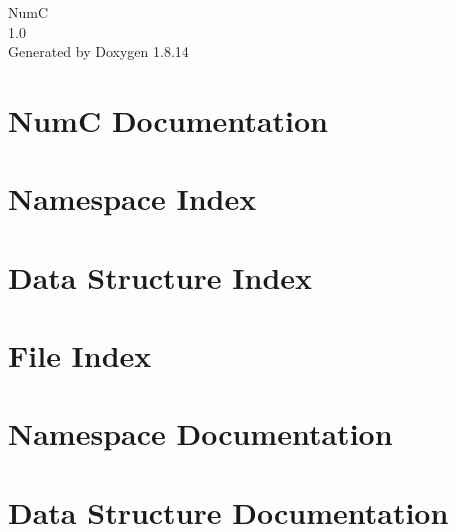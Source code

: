 \documentclass[twoside]{book}
\newcommand{\+}{\discretionary{\mbox{\scriptsize$\hookleftarrow$}}{}{}}
\newcommand{\clearemptydoublepage}{%
  \newpage{\pagestyle{empty}\cleardoublepage}%
}
\begin{document}
\hypersetup{pageanchor=false,
             bookmarksnumbered=true,
             pdfencoding=unicode
            }
\begin{titlepage}
\vspace*{7cm}
\begin{center}%
{\Large NumC \\[1ex]\large 1.\+0 }\\
\vspace*{1cm}
{\large Generated by Doxygen 1.8.14}\\
\end{center}
\end{titlepage}
\clearemptydoublepage
{}
\tableofcontents
\clearemptydoublepage
{}
\hypersetup{pageanchor=true}

\chapter{NumC Documentation}
\label{index}\hypertarget{index}{}
\chapter{Namespace Index}

\chapter{Data Structure Index}

\chapter{File Index}

\chapter{Namespace Documentation}





\chapter{Data Structure Documentation}




























\end{document}
